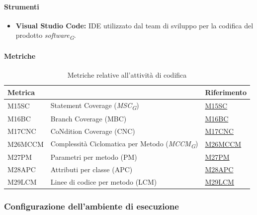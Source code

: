 \vspace{0.1cm}

\paragraph{Strumenti}
\begin{itemize}
    \item \textbf{Visual Studio Code:} IDE utilizzato dal team di sviluppo per la codifica del prodotto \textit{software}\textsubscript{\textit{G}}.
\end{itemize}

\vspace{0.1cm}

\paragraph{Metriche}
\begin{table}[H]
    \centering
    \begin{tabular}{|C{3cm}|C{4cm}|C{3cm}|}
    \hline
    \textbf{Metrica} &  & \textbf{Riferimento} \\
    \hline \hline
    M15SC & Statement Coverage (\textit{MSC}\textsubscript{\textit{G}}) &  \hyperlink{item:M15SC}{M15SC} \\
    M16BC & Branch Coverage (MBC) &  \hyperlink{item:M16BC}{M16BC} \\
    M17CNC & CoNdition Coverage (CNC) &  \hyperlink{item:M17CNC}{M17CNC} \\
    M26MCCM & Complessità Ciclomatica per Metodo (\textit{MCCM}\textsubscript{\textit{G}}) &  \hyperlink{item:M26MCCM}{M26MCCM} \\
    M27PM & Parametri per metodo (PM) & \hyperlink{item:M27PM}{M27PM} \\
    M28APC & Attributi per classe (APC) & \hyperlink{item:M28APC}{M28APC} \\
    M29LCM & Linee di codice per metodo (LCM) & \hyperlink{item:M29LCM}{M29LCM} \\ 
    \hline
    \end{tabular}
    \caption{Metriche relative all'attività di codifica}
\end{table}

\pagebreak

\subsubsection{Configurazione dell'ambiente di esecuzione}

